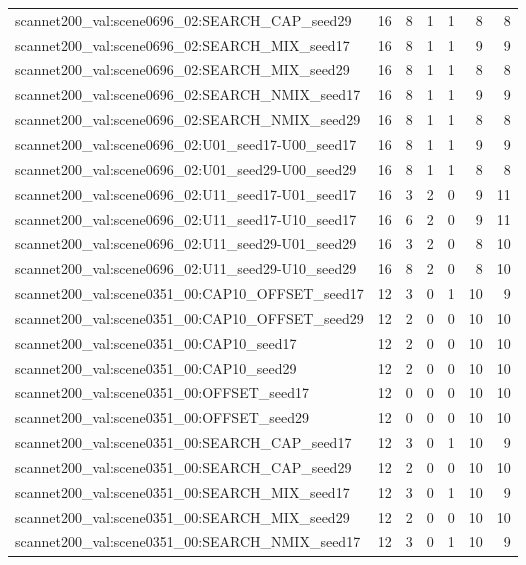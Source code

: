 \begin{table}[t]
\begin{tabular}{lrrrrrr}
scannet200\_val:scene0696\_02:SEARCH\_CAP\_seed29 & 16 & 8 & 1 & 1 & 8 & 8 \\
scannet200\_val:scene0696\_02:SEARCH\_MIX\_seed17 & 16 & 8 & 1 & 1 & 9 & 9 \\
scannet200\_val:scene0696\_02:SEARCH\_MIX\_seed29 & 16 & 8 & 1 & 1 & 8 & 8 \\
scannet200\_val:scene0696\_02:SEARCH\_NMIX\_seed17 & 16 & 8 & 1 & 1 & 9 & 9 \\
scannet200\_val:scene0696\_02:SEARCH\_NMIX\_seed29 & 16 & 8 & 1 & 1 & 8 & 8 \\
scannet200\_val:scene0696\_02:U01\_seed17-U00\_seed17 & 16 & 8 & 1 & 1 & 9 & 9 \\
scannet200\_val:scene0696\_02:U01\_seed29-U00\_seed29 & 16 & 8 & 1 & 1 & 8 & 8 \\
scannet200\_val:scene0696\_02:U11\_seed17-U01\_seed17 & 16 & 3 & 2 & 0 & 9 & 11 \\
scannet200\_val:scene0696\_02:U11\_seed17-U10\_seed17 & 16 & 6 & 2 & 0 & 9 & 11 \\
scannet200\_val:scene0696\_02:U11\_seed29-U01\_seed29 & 16 & 3 & 2 & 0 & 8 & 10 \\
scannet200\_val:scene0696\_02:U11\_seed29-U10\_seed29 & 16 & 8 & 2 & 0 & 8 & 10 \\
scannet200\_val:scene0351\_00:CAP10\_OFFSET\_seed17 & 12 & 3 & 0 & 1 & 10 & 9 \\
scannet200\_val:scene0351\_00:CAP10\_OFFSET\_seed29 & 12 & 2 & 0 & 0 & 10 & 10 \\
scannet200\_val:scene0351\_00:CAP10\_seed17 & 12 & 2 & 0 & 0 & 10 & 10 \\
scannet200\_val:scene0351\_00:CAP10\_seed29 & 12 & 2 & 0 & 0 & 10 & 10 \\
scannet200\_val:scene0351\_00:OFFSET\_seed17 & 12 & 0 & 0 & 0 & 10 & 10 \\
scannet200\_val:scene0351\_00:OFFSET\_seed29 & 12 & 0 & 0 & 0 & 10 & 10 \\
scannet200\_val:scene0351\_00:SEARCH\_CAP\_seed17 & 12 & 3 & 0 & 1 & 10 & 9 \\
scannet200\_val:scene0351\_00:SEARCH\_CAP\_seed29 & 12 & 2 & 0 & 0 & 10 & 10 \\
scannet200\_val:scene0351\_00:SEARCH\_MIX\_seed17 & 12 & 3 & 0 & 1 & 10 & 9 \\
scannet200\_val:scene0351\_00:SEARCH\_MIX\_seed29 & 12 & 2 & 0 & 0 & 10 & 10 \\
scannet200\_val:scene0351\_00:SEARCH\_NMIX\_seed17 & 12 & 3 & 0 & 1 & 10 & 9 \\

\end{tabular}
\end{table}
